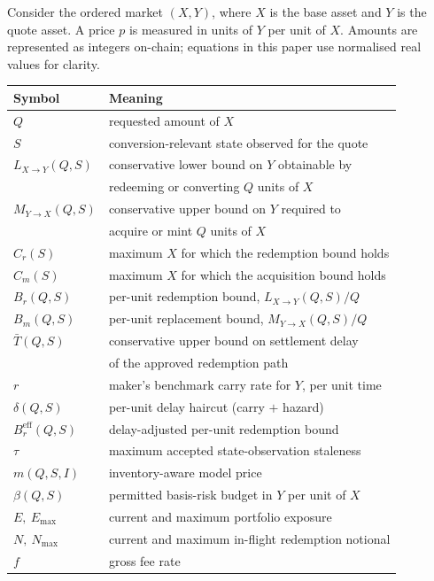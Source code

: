 \documentclass[10pt,twocolumn]{article}
\theoremstyle{definition}
\newcommand{\Lb}{L_{X\to Y}}
\newcommand{\Mb}{M_{Y\to X}}
\newcommand{\Br}{B_{r}}
\newcommand{\Bre}{B_{r}^{\mathrm{eff}}}
\newcommand{\Bm}{B_{m}}
\begin{document}
Consider the ordered market $(X,Y)$, where $X$ is the base asset and $Y$ is the quote asset. A price $p$ is
measured in units of $Y$ per unit of $X$. Amounts are represented as integers on-chain; equations in this paper
use normalised real values for clarity.

\begin{center}
\footnotesize
\setlength{\tabcolsep}{4pt}
\begin{tabular}{@{}ll@{}}
\toprule
\textbf{Symbol} & \textbf{Meaning} \\
\midrule
$Q$ & requested amount of $X$ \\
$S$ & conversion-relevant state observed for the quote \\
$\Lb(Q,S)$ & conservative lower bound on $Y$ obtainable by \\
           & redeeming or converting $Q$ units of $X$ \\
$\Mb(Q,S)$ & conservative upper bound on $Y$ required to \\
           & acquire or mint $Q$ units of $X$ \\
$C_r(S)$ & maximum $X$ for which the redemption bound holds \\
$C_m(S)$ & maximum $X$ for which the acquisition bound holds \\
$\Br(Q,S)$ & per-unit redemption bound, $\Lb(Q,S)/Q$ \\
$\Bm(Q,S)$ & per-unit replacement bound, $\Mb(Q,S)/Q$ \\
$\bar{T}(Q,S)$ & conservative upper bound on settlement delay \\
               & of the approved redemption path \\
$r$ & maker's benchmark carry rate for $Y$, per unit time \\
$\delta(Q,S)$ & per-unit delay haircut (carry $+$ hazard) \\
$\Bre(Q,S)$ & delay-adjusted per-unit redemption bound \\
$\tau$ & maximum accepted state-observation staleness \\
$m(Q,S,I)$ & inventory-aware model price \\
$\beta(Q,S)$ & permitted basis-risk budget in $Y$ per unit of $X$ \\
$E,\ E_{\max}$ & current and maximum portfolio exposure \\
$N,\ N_{\max}$ & current and maximum in-flight redemption notional \\
$f$ & gross fee rate \\
\bottomrule
\end{tabular}
\end{center}
\end{document}
